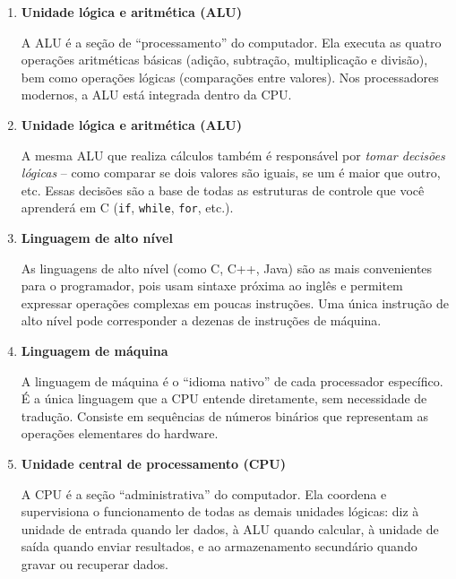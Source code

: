 \documentclass[12pt,a4paper]{article}
\begin{document}
\begin{respostabox}
\begin{enumerate}[label=\textbf{\alph*)}]
  \medskip
  \item \textbf{Unidade lógica e aritmética (ALU)}

  A ALU é a seção de ``processamento'' do computador. Ela executa as quatro operações
  aritméticas básicas (adição, subtração, multiplicação e divisão), bem como operações
  lógicas (comparações entre valores). Nos processadores modernos, a ALU está integrada
  dentro da CPU.

  \medskip
  \item \textbf{Unidade lógica e aritmética (ALU)}

  A mesma ALU que realiza cálculos também é responsável por \textit{tomar decisões
  lógicas} -- como comparar se dois valores são iguais, se um é maior que outro, etc.
  Essas decisões são a base de todas as estruturas de controle que você aprenderá em C
  (\texttt{if}, \texttt{while}, \texttt{for}, etc.).

  \medskip
  \item \textbf{Linguagem de alto nível}

  As linguagens de alto nível (como C, C++, Java) são as mais convenientes para o
  programador, pois usam sintaxe próxima ao inglês e permitem expressar operações
  complexas em poucas instruções. Uma única instrução de alto nível pode corresponder
  a dezenas de instruções de máquina.

  \medskip
  \item \textbf{Linguagem de máquina}

  A linguagem de máquina é o ``idioma nativo'' de cada processador específico. É a
  única linguagem que a CPU entende diretamente, sem necessidade de tradução. Consiste
  em sequências de números binários que representam as operações elementares do
  hardware.

  \medskip
  \item \textbf{Unidade central de processamento (CPU)}

  A CPU é a seção ``administrativa'' do computador. Ela coordena e supervisiona o
  funcionamento de todas as demais unidades lógicas: diz à unidade de entrada quando
  ler dados, à ALU quando calcular, à unidade de saída quando enviar resultados, e ao
  armazenamento secundário quando gravar ou recuperar dados.

\end{enumerate}
\end{respostabox}

\newpage

\end{document}
